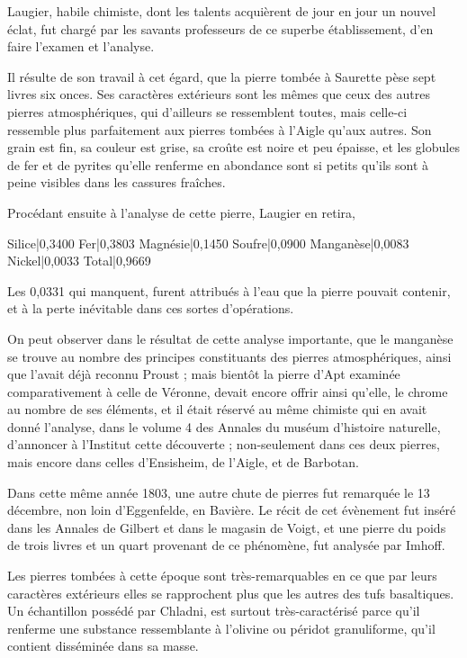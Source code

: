 \documentclass[a4paper, 12pt, oneside, french]{article}
\begin{document}
Laugier, habile chimiste, dont les talents acquièrent de jour en jour un nouvel éclat, fut chargé par les savants professeurs de ce superbe établissement, d'en faire l'examen et l'analyse.

Il résulte de son travail à cet égard, que la pierre tombée à Saurette pèse sept livres six onces. Ses caractères extérieurs sont les mêmes que ceux des autres pierres atmosphériques, qui d'ailleurs se ressemblent toutes, mais celle-ci ressemble plus parfaitement aux pierres tombées à l'Aigle qu'aux autres. Son grain est fin, sa couleur est grise, sa croûte est noire et peu épaisse, et les globules de fer et de pyrites qu'elle renferme en abondance sont si petits qu'ils sont à peine visibles dans les cassures fraîches.

Procédant ensuite à l'analyse de cette pierre, Laugier en retira,

Silice|0,3400  
Fer|0,3803  
Magnésie|0,1450  
Soufre|0,0900  
Manganèse|0,0083  
Nickel|0,0033  
Total|0,9669

Les 0,0331 qui manquent, furent attribués à l'eau que la pierre pouvait contenir, et à la perte inévitable dans ces sortes d'opérations.

On peut observer dans le résultat de cette analyse importante, que le manganèse se trouve au nombre des principes constituants des pierres atmosphériques, ainsi que l'avait déjà reconnu Proust ; mais bientôt la pierre d'Apt examinée comparativement à celle de Véronne, devait encore offrir ainsi qu'elle, le chrome au nombre de ses éléments, et il était réservé au même chimiste qui en avait donné l'analyse, dans le volume 4 des Annales du muséum d'histoire naturelle, d'annoncer à l'Institut cette découverte ; non-seulement dans ces deux pierres, mais encore dans celles d'Ensisheim, de l'Aigle, et de Barbotan.

Dans cette même année 1803, une autre chute de pierres fut remarquée le 13 décembre, non loin d'Eggenfelde, en Bavière. Le récit de cet évènement fut inséré dans les Annales de Gilbert et dans le magasin de Voigt, et une pierre du poids de trois livres et un quart provenant de ce phénomène, fut analysée par Imhoff.

Les pierres tombées à cette époque sont très-remarquables en ce que par leurs caractères extérieurs elles se rapprochent plus que les autres des tufs basaltiques. Un échantillon possédé par Chladni, est surtout très-caractérisé parce qu'il renferme une substance ressemblante à l'olivine ou péridot granuliforme, qu'il contient disséminée dans sa masse.
\end{document}

